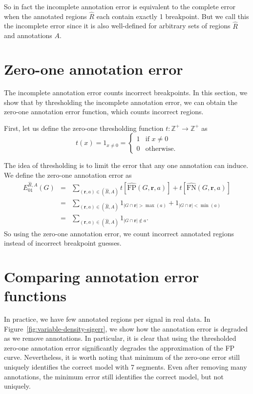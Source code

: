 \documentclass{jsfds} %
\renewcommand{\r}{ \mathbf{ r} }
\begin{document}
So in fact the incomplete annotation error is equivalent to the
complete error when the annotated regions $\hat R$ each contain
exactly 1 breakpoint. But we call this the incomplete error since it
is also well-defined for arbitrary sets of regions $\hat R$ and
annotations $A$.

\newpage

\section{Zero-one annotation error}
\label{sec:zero-one}

The incomplete annotation error counts incorrect breakpoints. In this
section, we show that by thresholding the incomplete annotation error,
we can obtain the zero-one annotation error function, which counts
incorrect regions.

First, let us define the zero-one thresholding function
$t:\mathbb Z^+\rightarrow\mathbb Z^+$ as
\begin{equation}
  \label{eq:thresholding}
  t(x)=1_{x\neq 0} =
  \begin{cases}
    1 & \text{if }x\neq 0\\
    0 & \text{otherwise}.
  \end{cases}
\end{equation}

The idea of thresholding is to limit the error that any one annotation
can induce. We define the zero-one annotation error as
\begin{eqnarray}
  \label{eq:ann01err}
  E_{01}^{\hat R,A}(G)
&=&\nonumber
 \sum_{(\r,a)\in(\hat R,A)} 
t\left[\hat{\text{FP}}(G,\r,a)\right]+
t\left[\hat{\text{FN}}(G,\r,a)\right]\\
&=&\nonumber
 \sum_{(\r,a)\in(\hat R,A)} 
1_{|G\cap\r|>\max(a)}+
1_{|G\cap \r|<\min(a)}\\
&=&
 \sum_{(\r,a)\in(\hat R,A)} 
1_{|G\cap\r|\not\in a}.
\end{eqnarray}
So using the zero-one annotation error, we count incorrect annotated
regions instead of incorrect breakpoint guesses.  

\newpage

\section{Comparing annotation error functions}

In practice, we have few annotated regions per signal in real data. In
Figure~\ref{fig:variable-density-sigerr}, we show how the annotation
error is degraded as we remove annotations. In particular, it is clear
that using the thresholded zero-one annotation error significantly
degrades the approximation of the FP curve. Nevertheless, it is worth
noting that minimum of the zero-one error still uniquely identifies
the correct model with 7 segments. Even after removing many
annotations, the minimum error still identifies the correct
model, but not uniquely.
\end{document}
